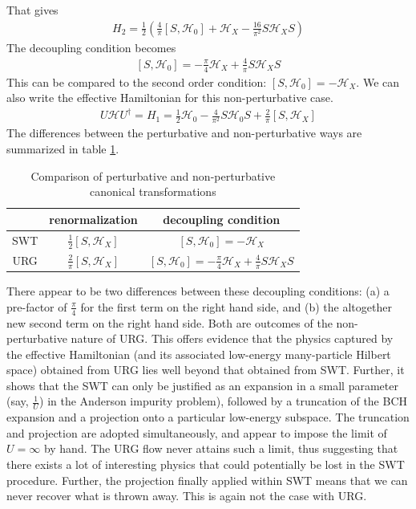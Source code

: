 \documentclass[twoside,11pt]{report}
\numberwithin{equation}{section}
\begin{document}
That gives
\begin{equation}\begin{aligned}
	H_2 = \frac{1}{2}\left(\frac{4}{\pi}\left[S,\mathcal{H}_0\right] + \mathcal{H}_X - \frac{16}{\pi^2}S \mathcal{H}_X S\right)
\end{aligned}\end{equation}
The decoupling condition becomes
\begin{equation}\begin{aligned}
	\left[S,\mathcal{H}_0\right] = -\frac{\pi}{4}\mathcal{H}_X + \frac{4}{\pi}S \mathcal{H}_X S
\end{aligned}\end{equation}
This can be compared to the second order condition: \(\left[S,\mathcal{H}_0\right] = -\mathcal{H}_X\). We  can also write the effective Hamiltonian for this non-perturbative case.
\begin{equation}\begin{aligned}
	U\mathcal{H} U^\dagger = H_1 = \frac{1}{2} \mathcal{H}_0 - \frac{4}{\pi^2}S\mathcal{H}_0 S  + \frac{2}{\pi}\left[S,\mathcal{H}_X\right]
\end{aligned}\end{equation}
The differences between the perturbative and non-perturbative ways are summarized in table \ref{comparison}.
\begin{table}
\centering
\begin{tabular}{|c|c|c|}
    \hline
        &renormalization&decoupling condition\\
    \hline
	SWT&\(\frac{1}{2} \left[S,\mathcal{H}_X\right]\)&\(\left[S,\mathcal{H}_0\right] = -\mathcal{H}_X\)\\
	URG&\(\frac{2}{\pi}\left[S,\mathcal{H}_X\right]\)&\(\left[S,\mathcal{H}_0\right] = -\frac{\pi}{4}\mathcal{H}_X + \frac{4}{\pi}S \mathcal{H}_X S\)\\
    \hline
\end{tabular}
    \caption{Comparison of perturbative and non-perturbative canonical transformations}
    \label{comparison}
\end{table}
There appear to be two differences between these decoupling conditions: (a)  a pre-factor of \(\frac{\pi}{4}\) for the first term on the right hand side, and (b) the altogether new second term on the right hand side. Both are outcomes of the non-perturbative nature of URG. This offers evidence that the physics captured by the effective Hamiltonian (and its associated low-energy many-particle Hilbert space) obtained from URG lies well beyond that obtained from SWT. Further, it shows that the SWT can only be justified as an expansion in a small parameter (say, $\frac{1}{U}$) in the Anderson impurity problem), followed by a truncation of the BCH expansion and a projection onto a particular low-energy subspace. The truncation and projection are adopted simultaneously, and appear to impose the limit of \(U = \infty\) by hand. The URG flow never attains such a limit, thus suggesting that there exists a lot of interesting physics that could potentially be lost in the SWT procedure. Further, the projection finally applied within SWT means that we can never recover what is thrown away. This is again not the case with URG.
\end{document}
